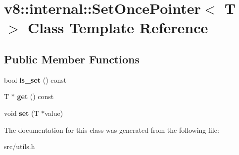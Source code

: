 \hypertarget{classv8_1_1internal_1_1_set_once_pointer}{}\section{v8\+:\+:internal\+:\+:Set\+Once\+Pointer$<$ T $>$ Class Template Reference}
\label{classv8_1_1internal_1_1_set_once_pointer}
\subsection*{Public Member Functions}
\begin{DoxyCompactItemize}
\item 
\hypertarget{classv8_1_1internal_1_1_set_once_pointer_ae7309ae47825023c583dc975ab64f3bf}{}bool {\bfseries is\+\_\+set} () const \label{classv8_1_1internal_1_1_set_once_pointer_ae7309ae47825023c583dc975ab64f3bf}

\item 
\hypertarget{classv8_1_1internal_1_1_set_once_pointer_a371f29e48328551e8c57f29b961f44b8}{}T $\ast$ {\bfseries get} () const \label{classv8_1_1internal_1_1_set_once_pointer_a371f29e48328551e8c57f29b961f44b8}

\item 
\hypertarget{classv8_1_1internal_1_1_set_once_pointer_a7ebb0e5532437fd52a91fd0c8ed60bd8}{}void {\bfseries set} (T $\ast$value)\label{classv8_1_1internal_1_1_set_once_pointer_a7ebb0e5532437fd52a91fd0c8ed60bd8}

\end{DoxyCompactItemize}


The documentation for this class was generated from the following file\+:\begin{DoxyCompactItemize}
\item 
src/utils.\+h\end{DoxyCompactItemize}
